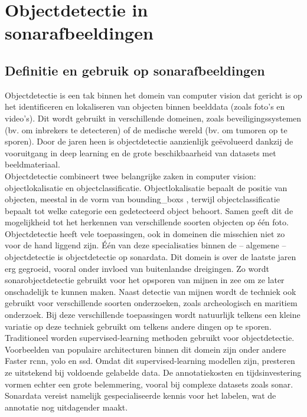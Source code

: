 \section{Objectdetectie in sonarafbeeldingen}

\subsection{Definitie en gebruik op sonarafbeeldingen}

Objectdetectie is een tak binnen het domein van computer vision dat gericht is op het identificeren en lokaliseren van objecten binnen beelddata (zoals foto's en video's). Dit wordt gebruikt in verschillende domeinen, zoals beveiligingssystemen (bv. om inbrekers te detecteren) of de medische wereld (bv. om tumoren op te sporen). Door de jaren heen is objectdetectie aanzienlijk geëvolueerd dankzij de vooruitgang in deep learning en de grote beschikbaarheid van datasets met beeldmateriaal. \autocite{He_2016} \\

Objectdetectie combineert twee belangrijke zaken in computer vision: objectlokalisatie en objectclassificatie. Objectlokalisatie bepaalt de positie van objecten, meestal in de vorm van \glspl{bounding_box} \autocite{Tompson_2015}, terwijl objectclassificatie bepaalt tot welke categorie een gedetecteerd object behoort. Samen geeft dit de mogelijkheid tot het herkennen van verschillende soorten objecten op één foto. \\

Objectdetectie heeft vele toepassingen, ook in domeinen die misschien niet zo voor de hand liggend zijn. Één van deze specialisaties binnen de -- algemene -- objectdetectie is objectdetectie op sonardata. Dit domein is over de laatste jaren erg gegroeid, vooral onder invloed van buitenlandse dreigingen. Zo wordt sonarobjectdetectie gebruikt voor het opsporen van mijnen in zee om ze later onschadelijk te kunnen maken. Naast detectie van mijnen wordt   de techniek ook gebruikt voor verschillende soorten onderzoeken, zoals archeologisch en maritiem onderzoek. Bij deze verschillende toepassingen wordt natuurlijk telkens een kleine variatie op deze techniek gebruikt om telkens andere dingen op te sporen. \autocite{Wang_2024} \\

Traditioneel worden supervised-learning methoden gebruikt voor objectdetectie. Voorbeelden van populaire architecturen binnen dit domein zijn onder andere Faster \gls{rcnn}, \gls{yolo} en \gls{ssd}. \autocite{Redmon_2016} Omdat dit supervised-learning modellen zijn, presteren  ze uitstekend bij voldoende gelabelde data. De annotatiekosten en tijdsinvestering vormen echter een grote belemmering, vooral bij complexe datasets zoals sonar. Sonardata vereist namelijk gespecialiseerde kennis voor het labelen, wat de annotatie nog uitdagender maakt. \autocite{Long_2015} \\

